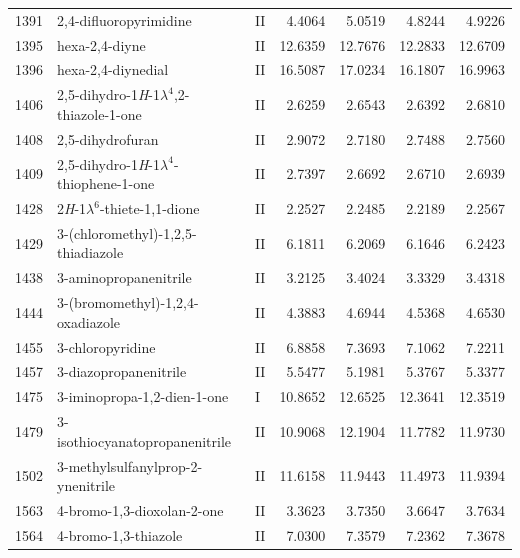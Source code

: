 \begin{longtable}{rlld{2.5}d{2.5}d{2.5}d{2.5}}
    1391 & 2,4-difluoropyrimidine                                 & II & 4.4064  & 5.0519  & 4.8244  & 4.9226  \\
    1395 & hexa-2,4-diyne                                         & II & 12.6359 & 12.7676 & 12.2833 & 12.6709 \\
    1396 & hexa-2,4-diynedial                                     & II & 16.5087 & 17.0234 & 16.1807 & 16.9963 \\
    1406 & 2,5-dihydro-1\textit{H}-1$\lambda^4$,2-thiazole-1-one  & II & 2.6259  & 2.6543  & 2.6392  & 2.6810  \\
    1408 & 2,5-dihydrofuran                                       & II & 2.9072  & 2.7180  & 2.7488  & 2.7560  \\
    1409 & 2,5-dihydro-1\textit{H}-1$\lambda^4$-thiophene-1-one   & II & 2.7397  & 2.6692  & 2.6710  & 2.6939  \\
    1428 & 2\textit{H}-1$\lambda^6$-thiete-1,1-dione              & II & 2.2527  & 2.2485  & 2.2189  & 2.2567  \\
    1429 & 3-(chloromethyl)-1,2,5-thiadiazole                     & II & 6.1811  & 6.2069  & 6.1646  & 6.2423  \\
    1438 & 3-aminopropanenitrile                                  & II & 3.2125  & 3.4024  & 3.3329  & 3.4318  \\
    1444 & 3-(bromomethyl)-1,2,4-oxadiazole                       & II & 4.3883  & 4.6944  & 4.5368  & 4.6530  \\
    1455 & 3-chloropyridine                                       & II & 6.8858  & 7.3693  & 7.1062  & 7.2211  \\
    1457 & 3-diazopropanenitrile                                  & II & 5.5477  & 5.1981  & 5.3767  & 5.3377  \\
    1475 & 3-iminopropa-1,2-dien-1-one                            & I  & 10.8652 & 12.6525 & 12.3641 & 12.3519 \\
    1479 & 3-isothiocyanatopropanenitrile                         & II & 10.9068 & 12.1904 & 11.7782 & 11.9730 \\
    1502 & 3-methylsulfanylprop-2-ynenitrile                      & II & 11.6158 & 11.9443 & 11.4973 & 11.9394 \\
    1563 & 4-bromo-1,3-dioxolan-2-one                             & II & 3.3623  & 3.7350  & 3.6647  & 3.7634  \\
    1564 & 4-bromo-1,3-thiazole                                   & II & 7.0300  & 7.3579  & 7.2362  & 7.3678  \\

\end{longtable}
